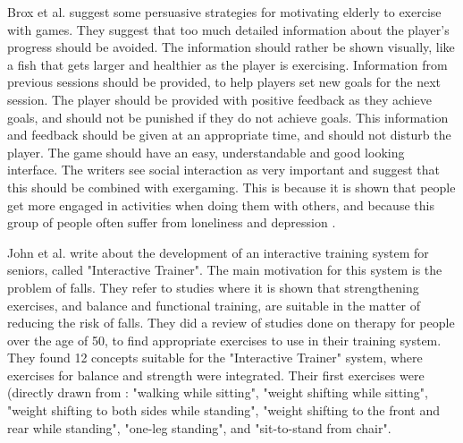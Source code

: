 Brox et al. \cite{exergamesforelderly} suggest some persuasive strategies for motivating elderly to exercise with games. They suggest that too much detailed information about the player's progress should be avoided. The information should rather be shown visually, like a fish that gets larger and healthier as the player is exercising. Information from previous sessions should be provided, to help players set new goals for the next session. The player should be provided with positive feedback as they achieve goals, and should not be punished if they do not achieve goals. This information and feedback should be given at an appropriate time, and should not disturb the player. The game should have an easy, understandable and good looking interface. The writers see social interaction as very important and suggest that this should be combined with exergaming. This is because it is shown that people get more engaged in activities when doing them with others, and because this group of people often suffer from loneliness and depression \cite{exergamesforelderly}. 

John et al. \cite{john2012smartsenior} write about the development of an interactive training system for seniors, called "Interactive Trainer". The main motivation for this system is the problem of falls. They refer to studies where it is shown that strengthening exercises, and balance and functional training, are suitable in the matter of reducing the risk of falls. They did a review of studies done on therapy for people over the age of 50, to find appropriate exercises to use in their training system. They found 12 concepts suitable for the "Interactive Trainer" system, where exercises for balance and strength were integrated. Their first exercises were (directly drawn from \cite{john2012smartsenior}: "walking while sitting", "weight shifting while sitting", "weight shifting to both sides while standing", "weight shifting to the front and rear while standing", "one-leg standing", and "sit-to-stand from chair".
      
